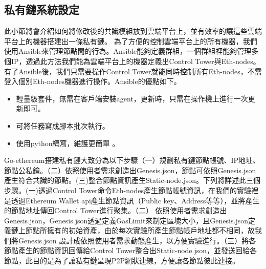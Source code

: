 \subsection{私有鏈系統設定}\label{se_5} 
此小節將會介紹如何將修改後的共識模組放到雲端平台上，並有效率的讓這些雲端平台上的機器搭建出一條私有鏈。
為了方便的控制雲端平台上的所有機器，我們使用Ansible來管理節點間的行為。Ansible能夠定義群組，一個群組裡能夠管理多個IP，透過此方法我們能為雲端平台上的機器定義出Control Tower與Eth-nodes。有了Ansible後，我們只需要操作Control Tower就能同時控制所有Eth-nodes，不需登入個別Eth-nodes機器進行操作。Ansible的優點如下。
\begin{itemize}%
\item 輕量級套件，無需在客戶端安裝agent，更新時，只需在操作機上進行一次更新即可。

\item 可將任務寫成腳本批次執行。

\item 使用python編寫，維護更簡單 。
\end{itemize}
Go-ethereum搭建私有鏈大致分為以下步驟（一）規劃私有鏈節點帳號、IP地址、節點公私鑰。（二）依照使用者需求創造出Genesis.json，節點可依照Genesis.json產生符合共識的節點。(三)整合節點資訊產生Static-node.json。下列將詳述此三個步驟。(一)透過Control Tower命令Eth-nodes產生節點帳號資訊，在我們的實驗裡是透過Ethereum Wallet api產生節點資訊（Public key、Address等等），並將產生的節點地址傳回Control Tower進行聚集。（二）
依照使用者需求創造出Genesis.json，Genesis.json透過定義GasLimit來制定區塊大小，且Genesis.json定義鏈上節點所擁有的初始資產，由於每次實驗所產生節點帳戶地址都不相同，故我們將Genesis.json 設計成依照使用者需求動態產生，以方便實驗進行。（三）將各節點產生的節點資訊回傳給Control Tower整合出Static-node.json，並發送回給各節點，此目的是為了讓私有鏈呈現P2P網狀連線，方便讓各節點彼此連接。





 


